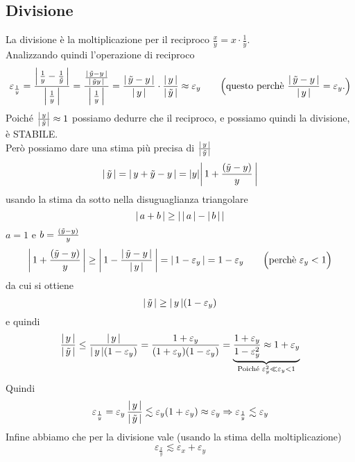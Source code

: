 \subsection{Divisione}
La divisione è la moltiplicazione per il reciproco $\frac{x}{y} = x \cdot \frac{1}{y}$.\\
Analizzando quindi l'operazione di reciproco
\[ \varepsilon_{\frac{1}{y}} = \frac{\abs*{\,\frac{1}{y} - \frac{1}{\Tilde{y}}\,} }{\abs*{\,\frac{1}{y}\,}} = \frac{\frac{\abs*{\,\Tilde{y} - y\,}}{\abs*{\,\Tilde{y}y\,}}}{\abs*{\,\frac{1}{y}\,}} = \frac{\abs*{\,\Tilde{y} - y\,}}{\abs*{\,y\,}} \cdot \frac{\abs*{\,y\,}}{\abs*{\,\Tilde{y}\,}} \approx \varepsilon_y \qquad \Bigl( \text{questo perchè } \frac{\abs*{\,\Tilde{y} - y\,}}{\abs*{\,y\,}} = \varepsilon_y . \Bigr)\]
Poiché $\frac{\lvert \,y\, \rvert}{\lvert \,\Tilde{y}\, \rvert} \approx 1$ possiamo dedurre che il reciproco, e possiamo quindi la divisione, è STABILE.\\
Però possiamo dare una stima più precisa di $\frac{\lvert \,y\, \rvert}{\lvert \,\Tilde{y}\, \rvert}$
\[ \abs{\,\Tilde{y}\,} = \abs{\,y + \Tilde{y} - y\,} = \abs{y}\abs*{\,1 + \frac{(\Tilde{y} - y)}{y}\,}\]
usando la stima da sotto nella disuguaglianza triangolare 
\[\abs{\, a + b\,} \ge \abs{\,\abs{\,a\,} - \abs{\,b\,}\,}\]
$a = 1$ e $b = \frac{(\Tilde{y} - y)}{y}$
\[\abs*{\,1 + \frac{(\Tilde{y} - y)}{y}\,} \ge \abs*{\,1 - \frac{\abs*{\,\Tilde{y} - y\,}}{\abs{\,y\,}}\,} = \abs*{\,1 - \varepsilon_y\,} = 1 - \varepsilon_y \qquad \Bigl( \text{perchè } \varepsilon_y < 1 \Bigr)\]
da cui si ottiene 
\[\abs{\,\Tilde{y}\,} \ge \abs{\,y\,}(1 - \varepsilon_y)\]
e quindi
\[\frac{\abs*{\,y\,}}{\abs*{\,\Tilde{y}\,}} \le \frac{\abs*{\,y\,}}{\abs{\,y\,}(1 - \varepsilon_y)} = \frac{1 + \varepsilon_y}{(1 + \varepsilon_y)(1 - \varepsilon_y)} = \underbrace{\frac{1 + \varepsilon_y}{1 - \varepsilon_y^2} \approx 1 + \varepsilon_y}_{\text{Poiché } \varepsilon_y^2 \ll \varepsilon_y < 1}\]
Quindi
\[\varepsilon_{\frac{1}{y}} = \varepsilon_y\,\frac{\abs{\,y\,}}{\abs{\,\Tilde{y}\,}} \lesssim \varepsilon_y (1 + \varepsilon_y) \approx \varepsilon_y \Rightarrow \varepsilon_{\frac{1}{y}} \lesssim \varepsilon_y\]
Infine abbiamo che per la divisione vale (usando la stima della moltiplicazione)
\[\varepsilon_{\frac{x}{y}} \lesssim \varepsilon_x+\varepsilon_y\]
